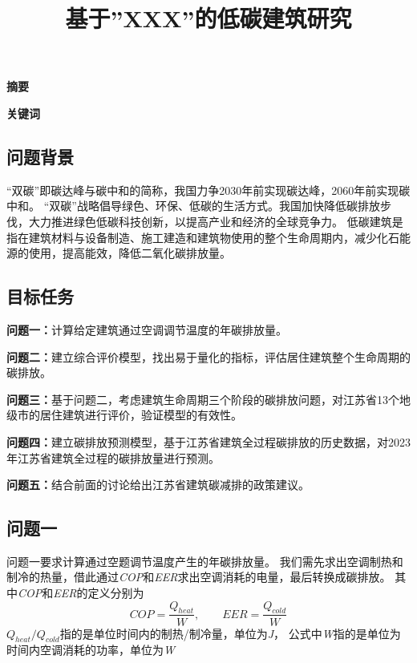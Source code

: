 \documentclass[a4paper, 12pt]{article}
\numberwithin{equation}{section}
\begin{document}
    \title{基于''XXX''的低碳建筑研究}
    \author{}
    \date{}
    \maketitle

    \centerline{\textbf{\LARGE{摘要}}}

    \textbf{\large{关键词}}

    {}
        \subsection{问题背景}
        “双碳”即碳达峰与碳中和的简称，我国力争2030年前实现碳达峰，2060年前实现碳中和。
        “双碳”战略倡导绿色、环保、低碳的生活方式。我国加快降低碳排放步伐，大力推进绿色低碳科技创新，以提高产业和经济的全球竞争力。
        低碳建筑是指在建筑材料与设备制造、施工建造和建筑物使用的整个生命周期内，减少化石能源的使用，提高能效，降低二氧化碳排放量。

        \subsection{目标任务}
            \textbf{问题一：}计算给定建筑通过空调调节温度的年碳排放量。

            \textbf{问题二：}建立综合评价模型，找出易于量化的指标，评估居住建筑整个生命周期的碳排放。

            \textbf{问题三：}基于问题二，考虑建筑生命周期三个阶段的碳排放问题，对江苏省13个地级市的居住建筑进行评价，验证模型的有效性。

            \textbf{问题四：}建立碳排放预测模型，基于江苏省建筑全过程碳排放的历史数据，对2023年江苏省建筑全过程的碳排放量进行预测。

            \textbf{问题五：}结合前面的讨论给出江苏省建筑碳减排的政策建议。


    {}
        \subsection{问题一}
            问题一要求计算通过空题调节温度产生的年碳排放量。
            我们需先求出空调制热和制冷的热量，借此通过\textit{COP}和\textit{EER}求出空调消耗的电量，最后转换成碳排放。
            其中\textit{COP}和\textit{EER}的定义分别为
            \begin{equation}
                COP = \frac{Q_{heat}}{W},\hspace{2em} EER = \frac{Q_{cold}}{W}
            \end{equation}
            $ Q_{heat} / Q_{cold} $指的是单位时间内的制热/制冷量，单位为\textit{J}，
            公式中\textit{W}指的是单位为时间内空调消耗的功率，单位为\textit{W}
\end{document}
